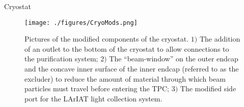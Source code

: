 \begin{subsubsection}{Cryostat}



\begin{figure}[htb]
\centering
\texttt{[image: ./figures/CryoMods.png]}
\caption{Pictures of the modified components of the cryostat. $1)$ The addition of an outlet to the bottom of the cryostat to allow connections to the purification system; $2)$ The ``beam-window'' on the outer endcap and the concave inner surface of the inner endcap (referred to as the excluder) to reduce the amount of material through which beam particles must travel before entering the TPC; $3)$ The modified side port for the LArIAT light collection system.}
\label{fig:LArIATCryoMods}
\end{figure}

\end{subsubsection}

